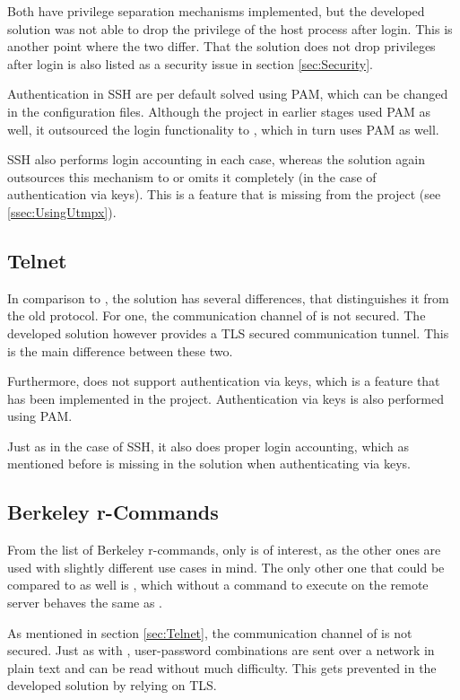 \documentclass[10pt,a4paper,titlepage,twoside,english,final]{zhawreprt}
\begin{document}
Both have privilege separation mechanisms implemented, but the developed solution was not able to drop the privilege of the host process after \gls{login}.
This is another point where the two differ.
That the solution does not drop privileges after \gls{login} is also listed as a security issue in section \ref{sec:Security}.

Authentication in \gls{SSH} are per default solved using \gls{PAM}, which can be changed in the configuration files.
Although the project in earlier stages used \gls{PAM} as well, it outsourced the \gls{login} functionality to \cite{login}, which in turn uses \gls{PAM} as well.

\gls{SSH} also performs \gls{login} accounting in each case, whereas the solution again outsources this mechanism to \cite{login} or omits it completely (in the case of authentication via keys).
This is a feature that is missing from the project (see \ref{ssec:UsingUtmpx}).

\subsection{Telnet}\label{ssec:CompTelnet}
In comparison to \cite{telnet}, the solution has several differences, that distinguishes it from the old protocol.
For one, the communication channel of \cite{telnet} is not secured.
The developed solution however provides a \gls{TLS} secured communication tunnel.
This is the main difference between these two.

Furthermore, \cite{telnet} does not support authentication via keys, which is a feature that has been implemented in the project.
Authentication via keys is also performed using \gls{PAM}.

Just as in the case of \gls{SSH}, it also does proper \gls{login} accounting, which as mentioned before is missing in the solution when authenticating via keys.

\subsection{Berkeley r-Commands}\label{ssec:BerkeleyRCommands}
From the list of Berkeley r-commands, only \cite{rlogin} is of interest, as the other ones are used with slightly different use cases in mind.
The only other one that could be compared to as well is \cite{rsh}, which without a command to execute on the remote server behaves the same as \cite{rlogin}.

As mentioned in section \ref{sec:Telnet}, the communication channel of \cite{rlogin} is not secured.
Just as with \cite{telnet}, user-password combinations are sent over a network in plain text and can be read without much difficulty.
This gets prevented in the developed solution by relying on \gls{TLS}.
\end{document}
